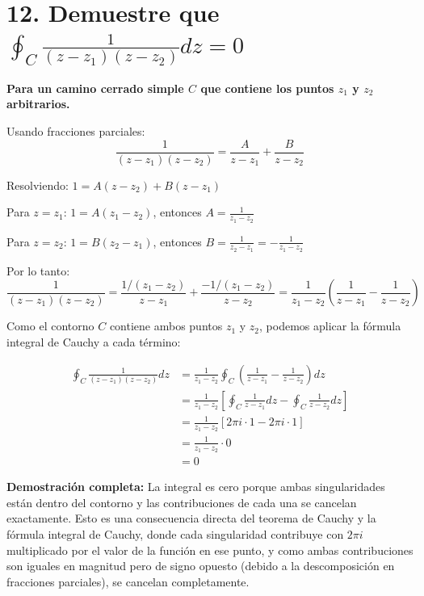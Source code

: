 \documentclass{article}
\begin{document}
\section*{12. Demuestre que $\oint_C \frac{1}{(z - z_1)(z - z_2)} dz = 0$}

\textbf{Para un camino cerrado simple $C$ que contiene los puntos $z_1$ y $z_2$ arbitrarios.}

Usando fracciones parciales:
$$\frac{1}{(z - z_1)(z - z_2)} = \frac{A}{z - z_1} + \frac{B}{z - z_2}$$

Resolviendo: $1 = A(z - z_2) + B(z - z_1)$

Para $z = z_1$: $1 = A(z_1 - z_2)$, entonces $A = \frac{1}{z_1 - z_2}$

Para $z = z_2$: $1 = B(z_2 - z_1)$, entonces $B = \frac{1}{z_2 - z_1} = -\frac{1}{z_1 - z_2}$

Por lo tanto:
$$\frac{1}{(z - z_1)(z - z_2)} = \frac{1/(z_1 - z_2)}{z - z_1} + \frac{-1/(z_1 - z_2)}{z - z_2} = \frac{1}{z_1 - z_2}\left(\frac{1}{z - z_1} - \frac{1}{z - z_2}\right)$$

Como el contorno $C$ contiene ambos puntos $z_1$ y $z_2$, podemos aplicar la fórmula integral de Cauchy a cada término:

\begin{align*}
\oint_C \frac{1}{(z - z_1)(z - z_2)} dz &= \frac{1}{z_1 - z_2} \oint_C \left(\frac{1}{z - z_1} - \frac{1}{z - z_2}\right) dz \\
                                         &= \frac{1}{z_1 - z_2} \left[\oint_C \frac{1}{z - z_1} dz - \oint_C \frac{1}{z - z_2} dz\right] \\
                                         &= \frac{1}{z_1 - z_2} \left[2\pi i \cdot 1 - 2\pi i \cdot 1\right] \\
                                         &= \frac{1}{z_1 - z_2} \cdot 0 \\
                                         &= 0
\end{align*}

\textbf{Demostración completa:} La integral es cero porque ambas singularidades están dentro del contorno y las contribuciones de cada una se cancelan exactamente. Esto es una consecuencia directa del teorema de Cauchy y la fórmula integral de Cauchy, donde cada singularidad contribuye con $2\pi i$ multiplicado por el valor de la función en ese punto, y como ambas contribuciones son iguales en magnitud pero de signo opuesto (debido a la descomposición en fracciones parciales), se cancelan completamente.
\end{document}
